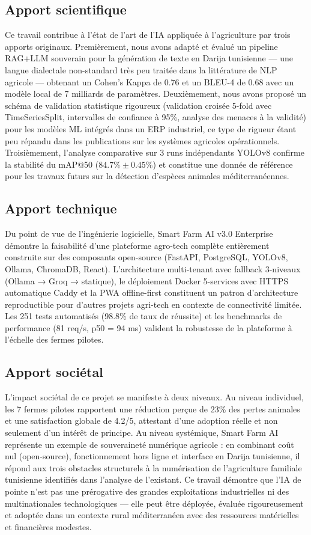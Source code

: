 \subsection*{Apport scientifique}
Ce travail contribue à l'état de l'art de l'IA appliquée à l'agriculture
par trois apports originaux. Premièrement, nous avons adapté et évalué
un pipeline RAG+LLM souverain pour la génération de texte en Darija
tunisienne — une langue dialectale non-standard très peu traitée dans
la littérature de NLP agricole — obtenant un Cohen's Kappa de 0.76 et
un BLEU-4 de 0.68 avec un modèle local de 7 milliards de paramètres.
Deuxièmement, nous avons proposé un schéma de validation statistique
rigoureux (validation croisée 5-fold avec TimeSeriesSplit, intervalles
de confiance à 95\%, analyse des menaces à la validité) pour les modèles
ML intégrés dans un ERP industriel, ce type de rigueur étant peu répandu
dans les publications sur les systèmes agricoles opérationnels. Troisièmement,
l'analyse comparative sur 3 runs indépendants YOLOv8 confirme la stabilité
du mAP@50 ($84.7\% \pm 0.45\%$) et constitue une donnée de référence pour
les travaux futurs sur la détection d'espèces animales méditerranéennes.

\subsection*{Apport technique}
Du point de vue de l'ingénierie logicielle, Smart Farm AI v3.0 Enterprise
démontre la faisabilité d'une plateforme agro-tech complète entièrement
construite sur des composants open-source (FastAPI, PostgreSQL, YOLOv8,
Ollama, ChromaDB, React). L'architecture multi-tenant avec fallback
3-niveaux (Ollama → Groq → statique), le déploiement Docker 5-services
avec HTTPS automatique Caddy et la PWA offline-first constituent un patron
d'architecture reproductible pour d'autres projets agri-tech en contexte
de connectivité limitée. Les 251 tests automatisés (98.8\% de taux de
réussite) et les benchmarks de performance (81 req/s, p50 = 94 ms) valident
la robustesse de la plateforme à l'échelle des fermes pilotes.

\subsection*{Apport sociétal}
L'impact sociétal de ce projet se manifeste à deux niveaux. Au niveau
individuel, les 7 fermes pilotes rapportent une réduction perçue de 23\%
des pertes animales et une satisfaction globale de 4.2/5, attestant d'une
adoption réelle et non seulement d'un intérêt de principe. Au niveau systémique,
Smart Farm AI représente un exemple de souveraineté numérique agricole :
en combinant coût nul (open-source), fonctionnement hors ligne et interface
en Darija tunisienne, il répond aux trois obstacles structurels à la
numérisation de l'agriculture familiale tunisienne identifiés dans l'analyse
de l'existant. Ce travail démontre que l'IA de pointe n'est pas une prérogative
des grandes exploitations industrielles ni des multinationales technologiques —
elle peut être déployée, évaluée rigoureusement et adoptée dans un contexte
rural méditerranéen avec des ressources matérielles et financières modestes.

